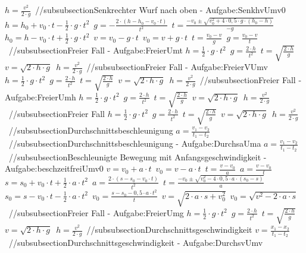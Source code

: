 $ h = \frac{ v^{2} }{2\cdot g} $\ 
//subsubsection{Senkrechter Wurf nach oben  - Aufgabe:SenkhvUmv0} 
$ h = h_{0}  + v_{0} \cdot t - \frac{1}{2}\cdot g\cdot t^{2} $\ 
$ g = - \frac{2\cdot (h - h_{0}  - v_{0} \cdot t)}{     t^{2} } $\ 
$ t = \frac{-v_{0}  \pm \sqrt{v_{0} ^{2} +4\cdot 0,5\cdot g\cdot (h_{0}  -h)}}{      -g} $\ 
$ h_{0}  = h - v_{0} \cdot t + \frac{1}{2}\cdot g\cdot t^{2} $\ 
$ v = v_{0}  - g\cdot t $\ 
$ v_{0}  = v + g\cdot t $\ 
$ t = \frac{v_{0} -v}{  g} $\ 
$ g = \frac{v_{0}  - v}{  t} $\ 
//subsubsection{Freier Fall - Aufgabe:FreierUmt} 
$ h = \frac{1}{2}\cdot g\cdot t^{2} $\ 
$ g = \frac{2\cdot h}{ t^{2} } $\ 
$ t = \sqrt{\frac{2\cdot h}{g}} $\ 
$ v = \sqrt{2\cdot h\cdot g} $\ 
$ h = \frac{ v^{2} }{2\cdot g} $\ 
//subsubsection{Freier Fall - Aufgabe:FreierVUmv} 
$ h = \frac{1}{2}\cdot g\cdot t^{2} $\ 
$ g = \frac{2\cdot h}{ t^{2} } $\ 
$ t = \sqrt{\frac{2\cdot h}{g}} $\ 
$ v = \sqrt{2\cdot h\cdot g} $\ 
$ h = \frac{ v^{2} }{2\cdot g} $\ 
//subsubsection{Freier Fall - Aufgabe:FreierUmh} 
$ h = \frac{1}{2}\cdot g\cdot t^{2} $\ 
$ g = \frac{2\cdot h}{ t^{2} } $\ 
$ t = \sqrt{\frac{2\cdot h}{g}} $\ 
$ v = \sqrt{2\cdot h\cdot g} $\ 
$ h = \frac{ v^{2} }{2\cdot g} $\ 
//subsubsection{Freier Fall} 
$ h = \frac{1}{2}\cdot g\cdot t^{2} $\ 
$ g = \frac{2\cdot h}{ t^{2} } $\ 
$ t = \sqrt{\frac{2\cdot h}{g}} $\ 
$ v = \sqrt{2\cdot h\cdot g} $\ 
$ h = \frac{ v^{2} }{2\cdot g} $\ 
//subsubsection{Durchschnittsbeschleunigung} 
$ a = \frac{v_{1}  - v_{2} }{t_{1}  - t_{2} } $\ 
//subsubsection{Durchschnittsbeschleunigung - Aufgabe:DurchsaUma} 
$ a = \frac{v_{1}  - v_{2} }{t_{1}  - t_{2} } $\ 
//subsubsection{Beschleunigte Bewegung mit Anfangsgeschwindigkeit - Aufgabe:beschzeitfreiUmv0} 
$ v = v_{0}  + a\cdot t $\ 
$ v_{0}  = v - a\cdot t $\ 
$ t = \frac{v - v_{0} }{a} $\ 
$ a = \frac{v - v_{0} }{  t} $\ 
$ s = s_{0}  + v_{0} \cdot t + \frac{1}{2}\cdot a\cdot t^{2} $\ 
$ a = \frac{2\cdot (s - s_{0}  - v_{0} \cdot t)}{     t^{2} } $\ 
$ t = \frac{-v_{0}  \pm \sqrt{v_{0} ^{2} -4\cdot 0,5\cdot a\cdot (s_{0}  -s)}}{       a} $\ 
$ s_{0}  = s - v_{0} \cdot t - \frac{1}{2}\cdot a\cdot t^{2} $\ 
$ v_{0}  =\frac{s-s_{0} -0,5\cdot a\cdot t^{2} }{    t} $\ 
$ v  =\sqrt{2\cdot a \cdot s+ v_{0}^2} $\ 
$ v_{0}  =\sqrt{v^2-2\cdot a \cdot s} $\ 
//subsubsection{Freier Fall - Aufgabe:FreierUmg} 
$ h = \frac{1}{2}\cdot g\cdot t^{2} $\ 
$ g = \frac{2\cdot h}{ t^{2} } $\ 
$ t = \sqrt{\frac{2\cdot h}{g}} $\ 
$ v = \sqrt{2\cdot h\cdot g} $\ 
$ h = \frac{ v^{2} }{2\cdot g} $\ 
//subsubsection{Durchschnittsgeschwindigkeit} 
$ v = \frac{x_{1}  - x_{2} }{t_{1}  - t_{2} } $\ 
//subsubsection{Durchschnittsgeschwindigkeit - Aufgabe:DurchsvUmv} 
